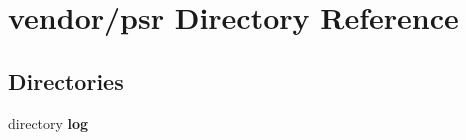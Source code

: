 \section{vendor/psr Directory Reference}
\label{dir_534ebee2f5b84be66b33c68ebee3fc50}
\subsection*{Directories}
\begin{DoxyCompactItemize}
\item 
directory {\bf log}
\end{DoxyCompactItemize}
